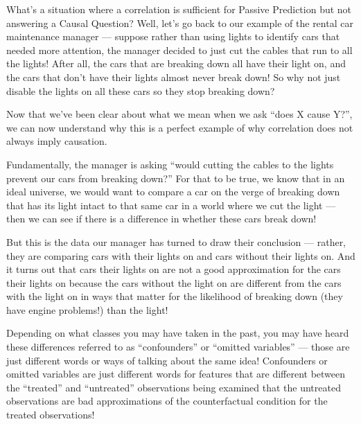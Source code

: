 \documentclass[letterpaper,10pt,english]{jupyterBook}
\begin{document}
\sphinxAtStartPar
What’s a situation where a correlation is sufficient for Passive Prediction but not answering a Causal Question? Well, let’s go back to our example of the rental car maintenance manager — suppose rather than using  lights to identify cars that needed more attention, the manager decided to just cut the cables that run to all the  lights! After all, the cars that are breaking down all have their  light on, and the cars that don’t have their  lights almost never break down! So why not just disable the  lights on all these cars so they stop breaking down?

\sphinxAtStartPar
Now that we’ve been clear about what we mean when we ask “does X cause Y?”, we can now understand why this is a perfect example of why correlation does not always imply causation.

\sphinxAtStartPar
Fundamentally, the manager is asking “would cutting the cables to the  lights prevent our cars from breaking down?” For that to be true, we know that in an ideal universe, we would want to compare a car on the verge of breaking down that has its  light intact to that same car in a world where we cut the  light — then we can see if there is a difference in whether these cars break down!

\sphinxAtStartPar
But this is  the data our manager has turned to draw their conclusion — rather, they are comparing cars with their  lights on and cars without their  lights on. And it turns out that cars  their  lights on are not a good approximation for the cars  their  lights on because the cars without the light on are different from the cars with the light on in ways that matter for the likelihood of breaking down (they have engine problems!)  than the  light!

\sphinxAtStartPar
Depending on what classes you may have taken in the past, you may have heard these differences referred to as “confounders” or “omitted variables” — those are just different words or ways of talking about the same idea! Confounders or omitted variables are just different words for features that are different between the “treated” and “untreated” observations being examined that the untreated observations are bad approximations of the counter\sphinxhyphen{}factual condition for the treated observations!
\end{document}
